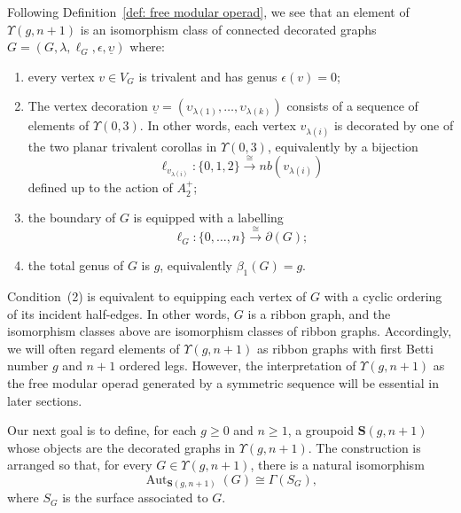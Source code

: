 \documentclass{amsart}
\newcommand{\bS}{\mathbf{S}}
\newcommand{\Aut}{\operatorname{Aut}}
\newcommand{\nb}{nb}
\theoremstyle{definition}
\numberwithin{equation}{section}
\begin{document}
\medskip 
Following Definition~\ref{def: free modular operad}, we see that an element of $\Upsilon(g,n+1)$ is an isomorphism class of connected decorated graphs $G=(G,\lambda, \ell_G,\epsilon,\underline{\upsilon})$ where:
\begin{enumerate}
    \item every vertex $v\in V_G$ is trivalent and has genus $\epsilon(v)=0$;
    \item The vertex decoration $\underline{\upsilon} = (\upsilon_{\lambda(1)}, \ldots, \upsilon_{\lambda(k)})$ consists of a sequence of elements of $\Upsilon(0,3)$. In other words, each vertex $v_{\lambda(i)}$ is decorated by one of the two planar trivalent corollas in $\Upsilon(0,3)$, equivalently by a bijection
    \[
    \ell_{v_{\lambda(i)}}:\{0,1,2\}\xrightarrow{\cong}\nb(v_{\lambda(i)})
    \]
    defined up to the action of $A_2^+$;
    \item the boundary of $G$ is equipped with a labelling
    \[
    \ell_G:\{0,\ldots,n\}\xrightarrow{\cong}\partial(G);
    \]
    \item the total genus of $G$ is $g$, equivalently $\beta_1(G)=g$.
\end{enumerate}

Condition~(2) is equivalent to equipping each vertex of $G$ with a cyclic ordering of its incident half-edges. In other words, $G$ is a ribbon graph, and the isomorphism classes above are isomorphism classes of ribbon graphs. Accordingly, we will often regard elements of $\Upsilon(g,n+1)$ as ribbon graphs with first Betti number $g$ and $n+1$ ordered legs. However, the interpretation of $\Upsilon(g,n+1)$ as the free modular operad generated by a symmetric sequence will be essential in later sections.


\medskip



Our next goal is to define, for each $g\geq 0$ and $n\geq 1$, a groupoid $\bS(g,n+1)$ whose objects are the decorated graphs in $\Upsilon(g,n+1)$. The construction is arranged so that, for every $G\in \Upsilon(g,n+1)$, there is a natural isomorphism
\[
\Aut_{\bS(g,n+1)}(G)\cong \Gamma(S_G),
\] where $S_G$ is the surface associated to $G$.  
\end{document}

